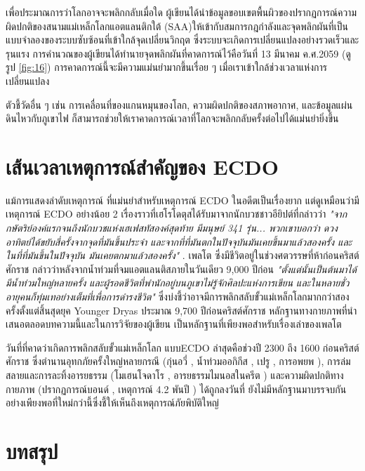 \documentclass[10pt,twocolumn,letterpaper]{article}
\begin{document}
เพื่อประมาณการว่าโลกอาจจะพลิกกลับเมื่อใด ผู้เขียนได้นำข้อมูลขอบเขตพื้นผิวของปรากฏการณ์ความผิดปกติของสนามแม่เหล็กโลกแอตแลนติกใต้ (SAA)ให้เข้ากับสมการกฎกำลังและจุดพลิกผันที่เป็นแบบจำลองของระบบซับซ้อนที่เข้าใกล้จุดเปลี่ยนวิกฤต ซึ่งระบบจะเกิดการเปลี่ยนแปลงอย่างรวดเร็วและรุนแรง การคำนวณของผู้เขียนได้ทำนายจุดพลิกผันที่คาดการณ์ไว้คือวันที่ 13 มีนาคม ค.ศ.2059 (ดูรูป \ref{fig:16}) การคาดการณ์นี้จะมีความแม่นยำมากขึ้นเรื่อย ๆ เมื่อเราเข้าใกล้ช่วงเวลาแห่งการเปลี่ยนแปลง \cite{136}

ตัวชี้วัดอื่น ๆ เช่น การเคลื่อนที่ของแกนหมุนของโลก, ความผิดปกติของสภาพอากาศ, และข้อมูลแผ่นดินไหวกับภูเขาไฟ ก็สามารถช่วยให้เราคาดการณ์เวลาที่โลกจะพลิกกลับครั้งต่อไปได้แม่นยำยิ่งขึ้น

\section{เส้นเวลาเหตุการณ์สำคัญของ ECDO}แม้การแสดงลำดับเหตุการณ์ ที่แม่นยำสำหรับเหตุการณ์ ECDO ในอดีตเป็นเรื่องยาก แต่ดูเหมือนว่ามีเหตุการณ์ ECDO อย่างน้อย 2 เรื่องราวที่เฮโรโดตุสได้รับมาจากนักบวชชาวอียิปต์ที่กล่าวว่า
 \textit{"จากกษัตริย์องค์แรกจนถึงนักบวชแห่งเฮเฟสทัสองค์สุดท้าย มีมนุษย์ 341 รุ่น... พวกเขาบอกว่า ดวงอาทิตย์ได้ขยับสี่ครั้งจากจุดที่มันขึ้นประจำ และจากที่ที่มันตกในปัจจุบันมันเคยขึ้นมาแล้วสองครั้ง  และในที่ที่มันขึ้นในปัจจุบัน มันเคยตกมาแล้วสองครั้ง"} \cite{32}. เพลโต ซึ่งมีชีวิตอยู่ในช่วงศตวรรษที่ห้าก่อนคริสต์ศักราช \cite{111} กล่าวว่าหลังจากน้ำท่วมที่จมแอตแลนติสภายในวันเดียว 9,000 ปีก่อน \textit{"ตั้งแต่นั้นเป็นต้นมาได้มีน้ำท่วมใหญ่หลายครั้ง และผู้รอดชีวิตที่พำนักอยู่บนภูเขาไม่รู้จักศิลปะแห่งการเขียน และในหลายชั่วอายุคนก็ทุ่มเทอย่างเต็มที่เพื่อการดำรงชีวิต"} \cite{112} ซึ่งบ่งชี้ว่าอาจมีการพลิกสลับขั้วแม่เหล็กโลกมากกว่าสองครั้งตั้งแต่สิ้นสุดยุค Younger Dryas ประมาณ 9,700 ปีก่อนคริสต์ศักราช หลักฐานทางกายภาพที่นำเสนอตลอดบทความนี้และในการวิจัยของผู้เขียน \cite{2} เป็นหลักฐานที่เพียงพอสำหรับเรื่องเล่าของเพลโต

วันที่ที่คาดว่าเกิดการพลิกสลับขั้วแม่เหล็กโลก แบบECDO ล่าสุดคือช่วงปี 2300 ถึง 1600 ก่อนคริสต์ศักราช ซึ่งตำนานอุทกภัยครั้งใหญ่หลายกรณี (กุ่นอวี่ \cite{113,114,115}, น้ำท่วมออกิกีส \cite{116,117}, เปรู \cite{118,119}, การอพยพ \cite{120}), การล่มสลายและการละทิ้งอารยธรรม (โมเฮนโจดาโร \cite{121}, อารยธรรมไมนอสในครีต \cite{100,101}) และความผิดปกติทางกายภาพ (ปรากฏการณ์บอนด์ \cite{122}, เหตุการณ์ 4.2 พันปี \cite{90}) ได้ถูกลงวันที่ ยังไม่มีหลักฐานมาบรรจบกันอย่างเพียงพอที่ใหม่กว่านี้ซึ่งชี้ให้เห็นถึงเหตุการณ์ภัยพิบัติใหญ่

\section{บทสรุป}
\end{document}
